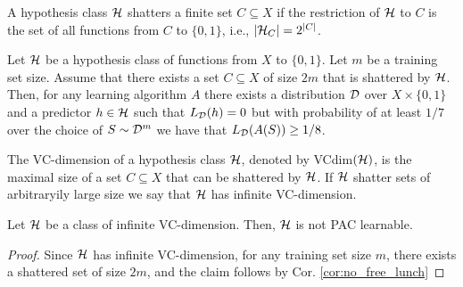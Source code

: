 \documentclass[11pt,a4paper]{article}
\begin{document}
\begin{definition}[Shattering]
    A hypothesis class $\mathcal{H}$ shatters a finite set $C\subseteq X$ if the restriction of $\mathcal{H}$ to $C$ is the set of all functions from $C$ to $\{0,1\}$, i.e., $|\mathcal{H}_C| = 2^{|C|}$.
\end{definition}

\begin{corollary}\label{cor:no_free_lunch}
    Let $\mathcal{H}$ be a hypothesis class of functions from $X$ to $\{0,1\}$. Let $m$ be a training set size. Assume that there exists a set $C\subseteq X$ of size $2m$ that is shattered by $\mathcal{H}$. Then, for any learning algorithm $A$ there exists a distribution $\mathcal{D}$ over $X\times\{0,1\}$ and a predictor $h\in \mathcal{H}$ such that $L_{\mathcal{D}}(h) = 0$ but with probability of at least $1/7$ over the choice of $S\sim \mathcal{D}^m$ we have that $L_{\mathcal{D}}(A(S))\ge 1/8$.
\end{corollary}

\begin{definition}[VC-dimension]
    The VC-dimension of a hypothesis class $\mathcal{H}$, denoted by VCdim$(\mathcal{H})$, is the maximal size of a set $C\subseteq X$ that can be shattered by $\mathcal{H}$. If $\mathcal{H}$ shatter sets of arbitraryily large size we say that $\mathcal{H}$ has infinite VC-dimension.
\end{definition}

\begin{proposition}
    Let $\mathcal{H}$ be a class of infinite VC-dimension. Then, $\mathcal{H}$ is not PAC learnable.
\end{proposition}

\begin{proof}
    Since $\mathcal{H}$ has infinite VC-dimension, for any training set size $m$, there exists a shattered set of size $2m$, and the claim follows by Cor. \ref{cor:no_free_lunch}
\end{proof}
\end{document}
